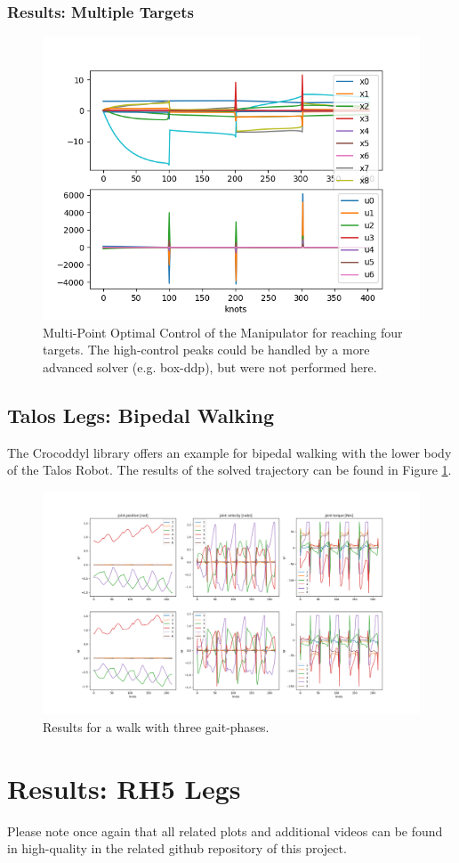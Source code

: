 \subsubsection{Results: Multiple Targets}
\begin{figure}[h!]
\centering
\includegraphics[width=.5\linewidth]{Media/Crocoddyl/ExArm/ArmSolution.png}
\caption{Multi-Point Optimal Control of the Manipulator for reaching four targets. The high-control peaks could be handled by a more advanced solver (e.g. box-ddp), but were not performed here.}
\end{figure}

\subsection{Talos Legs: Bipedal Walking}
The Crocoddyl library offers an example for bipedal walking with the lower body of the Talos \cite{stasse2017talos} Robot. The results of the solved trajectory can be found in Figure \ref{fig:TalosGait}. 

\begin{figure}[h!]
\centering
\includegraphics[width=.7\linewidth]{Media/Crocoddyl/ExBiped/TalosGait_Solution.png}
\caption{Results for a walk with three gait-phases.}
\label{fig:TalosGait}
\end{figure}

  
  
\section{Results: RH5 Legs}
Please note once again that all related plots and additional videos can be found in high-quality in the related github repository \cite{julesserOCFrameworks} of this project.
